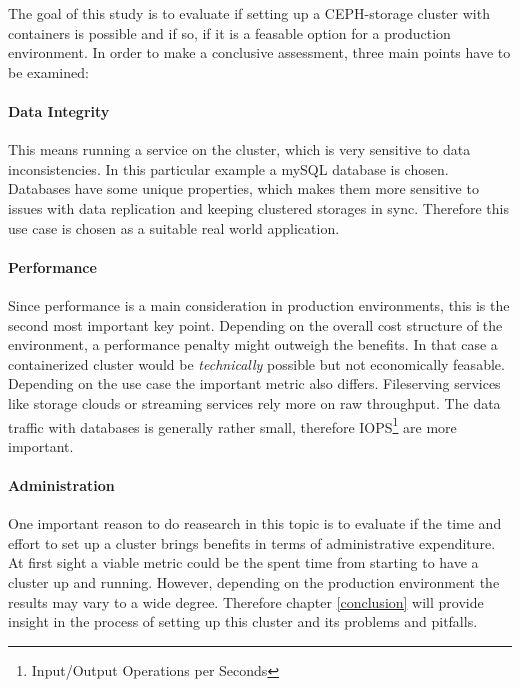 \documentclass[titlepage, a4paper, 11pt]{scrartcl}
\begin{document}
            The goal of this study is to evaluate if setting up a CEPH-storage cluster with containers is possible and if so, 
            if it is a feasable option for a production environment. In order to make a conclusive assessment, three main points 
            have to be examined:

            \paragraph{Data Integrity}

                This means running a service on the cluster, which is very sensitive to data inconsistencies.
                In this particular example a mySQL database is chosen. Databases have some unique properties, which makes them more sensitive 
                to issues with data replication and keeping clustered storages in sync. 
                Therefore this use case is chosen as a suitable real world application.

            \paragraph{Performance}

                Since performance is a main consideration in production environments, this is 
                the second most important key point. Depending on the overall cost structure of the environment, 
                a performance penalty might outweigh the benefits. In that case a containerized cluster 
                would be \textit{technically} possible but not economically feasable. Depending on the use case
                the important metric also differs. Fileserving services like storage clouds or streaming services 
                rely more on raw throughput. The data traffic with databases is generally rather small, therefore
                IOPS\footnote{Input/Output Operations per Seconds} are more important.

            \paragraph{Administration}

                One important reason to do reasearch in this topic is to evaluate if the time and effort to
                set up a cluster brings benefits in terms of administrative expenditure. At first sight a viable
                metric could be the spent time from starting to have a cluster up and running. However, depending
                on the production environment the results may vary to a wide degree. Therefore chapter \ref*{conclusion}
                will provide insight in the process of setting up this cluster and its problems and pitfalls.
\end{document}
